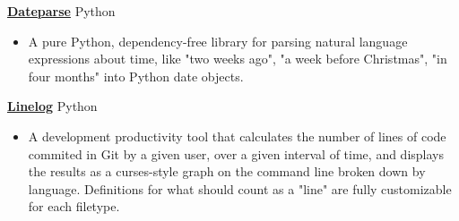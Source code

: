 \documentclass[11pt]{article}
\newcommand{\sectioncontent}[1]{
    \begingroup
        \begin{FlushLeft}
        \vspace{-3mm}
        \sffamily\small#1
        \end{FlushLeft}
    \endgroup
    \vspace{2mm}
}
\newcommand{\project}[2]{
    \begingroup
        \textbf{\small#1}
        \hfill\color{black!70}\small{#2}
    \endgroup
}
\newcommand{\spacevv}{
    \vspace{2mm}
}
\begin{document}
    \sectioncontent{
      \iffalse
      \project{\href{https://github.com/keagud/della}{Della}}{Python}
        \begin{itemize}
          \item A personal orginizer similar to TaskWarrior, with the added feature of natural language processing to allow todos to be managed with a simple, naturalistic command syntax, e.g. "pick up Dave at the airport a week from this Wednesday." 
          \item Users can interact with and view their upcoming tasks either from the command line, or from a terminal graphical interface. 
        \end{itemize}
        \spacevv
        \fi
        \iffalse
        \project{\href{https://github.com/keagud/Quackbot}{Quackbot}}{Javascript, Typescript}
        \begin{itemize}
            \item A Discord bot  
        \end{itemize}
        \spacevv
        \fi

        \project{\href{https://github.com/keagud/dateparse}{Dateparse}}{Python}
        \begin{itemize}
          \item A pure Python, dependency-free library for parsing natural language expressions about time, like "two weeks ago", "a week before Christmas", "in four months" into Python date objects. 
        \end{itemize}
        \spacevv

        \project{\href{https://github.com/keagud/linelog}{Linelog}}{Python}
        \begin{itemize}
          \item A development productivity tool that calculates the number of lines of code commited in Git by a given user, over a given interval of time, and displays the results as a curses-style graph on the command line broken down by language. Definitions for what should count as a "line" are fully customizable for each filetype.
        \end{itemize}
        \spacevv

}
\end{document}
